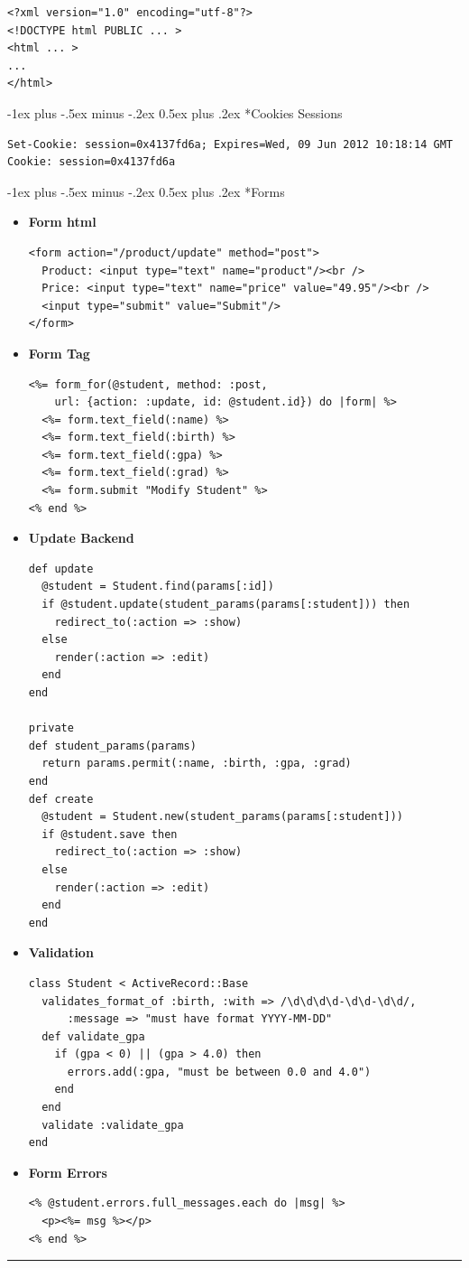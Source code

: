\documentclass[10pt,landscape]{article}
\makeatletter
\renewcommand{\section}{\@startsection{section}{1}{0mm}%
                                {-1ex plus -.5ex minus -.2ex}%
                                {0.5ex plus .2ex}%
                                {\normalfont\large\bfseries}}
\makeatother
\begin{document}
\begin{multicols}{2}
\begin{verbatim}
<?xml version="1.0" encoding="utf-8"?>
<!DOCTYPE html PUBLIC ... >
<html ... >
...
</html>
\end{verbatim}
\section*{Cookies Sessions}
\begin{verbatim}
Set-Cookie: session=0x4137fd6a; Expires=Wed, 09 Jun 2012 10:18:14 GMT
Cookie: session=0x4137fd6a
\end{verbatim}
\section*{Forms}
\begin{itemize}
\item \textbf{Form html}
\begin{verbatim}
<form action="/product/update" method="post">
  Product: <input type="text" name="product"/><br />
  Price: <input type="text" name="price" value="49.95"/><br />
  <input type="submit" value="Submit"/>
</form>
\end{verbatim}
\item \textbf{Form Tag}
\begin{verbatim}
<%= form_for(@student, method: :post,
    url: {action: :update, id: @student.id}) do |form| %>
  <%= form.text_field(:name) %>
  <%= form.text_field(:birth) %>
  <%= form.text_field(:gpa) %>
  <%= form.text_field(:grad) %>
  <%= form.submit "Modify Student" %>
<% end %>
\end{verbatim}
\item \textbf{Update Backend}
\begin{verbatim}
def update
  @student = Student.find(params[:id])
  if @student.update(student_params(params[:student])) then
    redirect_to(:action => :show)
  else
    render(:action => :edit)
  end
end

private
def student_params(params)
  return params.permit(:name, :birth, :gpa, :grad)
end
def create
  @student = Student.new(student_params(params[:student]))
  if @student.save then
    redirect_to(:action => :show)
  else
    render(:action => :edit)
  end
end
\end{verbatim}
\item \textbf{Validation}
\begin{verbatim}
class Student < ActiveRecord::Base
  validates_format_of :birth, :with => /\d\d\d\d-\d\d-\d\d/,
      :message => "must have format YYYY-MM-DD"
  def validate_gpa
    if (gpa < 0) || (gpa > 4.0) then
      errors.add(:gpa, "must be between 0.0 and 4.0")
    end
  end
  validate :validate_gpa
end
\end{verbatim}
\item \textbf{Form Errors}
\begin{verbatim}
<% @student.errors.full_messages.each do |msg| %>
  <p><%= msg %></p>
<% end %>
\end{verbatim}
\end{itemize}
\rule{0.3\linewidth}{0.25pt}
\scriptsize


\end{multicols}
\end{document}
